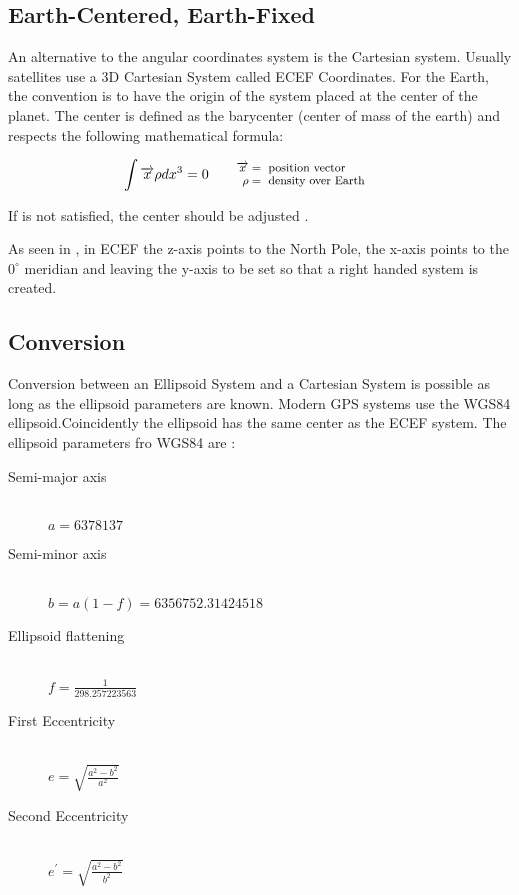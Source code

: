 \subsection{Earth-Centered, Earth-Fixed}
\label{sub-sec:ecef}
An alternative to the angular coordinates system is the Cartesian system. Usually
satellites use a 3D Cartesian System called ECEF
Coordinates. For the Earth,  the convention is to have the origin of the system
placed at the center of the planet. The center is defined as the barycenter 
(center of mass of the earth) and respects the following mathematical formula:

\begin{equation}
\int \overrightarrow {x}\rho dx^{3} = 0
\qquad\parbox{4.0cm}{\footnotesize$\begin{aligned} 
  \overrightarrow {x} &= \text{ position vector}
  \\[-1.0ex] \rho &= \text{ density over Earth}
  \end{aligned}$}
\label{eqn:ecef-int}
\end{equation}

If  is not satisfied, the center should
be adjusted \cite{earth-coordinates}.

As seen in , in ECEF the z-axis points to the North
Pole,  the x-axis points to the $0^{\circ}$ meridian and leaving the y-axis to be
set so that a right handed system is created.
\subsection{Conversion}
\label{sub-sec:lla2ecef}
Conversion between an Ellipsoid System and a Cartesian System is possible 
as long as the ellipsoid parameters are known. Modern GPS systems use 
the WGS84 ellipsoid.Coincidently the ellipsoid has the same center as the ECEF
system. The ellipsoid parameters fro WGS84 are \cite{datum}:


\begin{description}
\item [Semi-major axis] \hfill \\
$a = 6378137$
\item [Semi-minor axis] \hfill \\
$b = a(1-f) = 6356752.31424518$
\item [Ellipsoid flattening] \hfill \\
$ f = \frac{1}{298.257223563}$
\item [First Eccentricity] \hfill \\
$e = \sqrt{\frac{a^{2}-b^{2}}{a^{2}}}$
\item [Second Eccentricity] \hfill \\
$e^{'} = \sqrt{\frac{a^{2}-b^{2}}{b^{2}}}$
\end{description}

